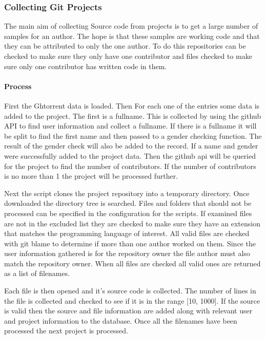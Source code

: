 \documentclass{article}
\begin{document}
\subsubsection{Collecting Git Projects}
The main aim of collecting Source code from projects is to get a large number of samples for an author. The hope is that these samples are working code and that they can be attributed to only the one author. To do this repositories can be checked to make sure they only have one contributor and files checked to make sure only one contributor has written code in them.

\paragraph{Process}
First the Ghtorrent data is loaded. Then For each one of the entries some data is added to the project. The first is a fullname. This is collected by using the github API to find user information and collect a fullname. If there is a fullname it will be split to find the first name and then passed to a gender checking function. The result of the gender check will also be added to the record. If a name and gender were successfully added to the project data. Then the github api will be queried for the project to find the number of contributors. If the number of contributors is no more than 1 the project will be processed further.

Next the script clones the project repository into a temporary directory. Once downloaded the directory tree is searched. Files and folders that should not be processed can be specified in the configuration for the scripts. If examined files are not in the excluded list they are checked to make sure they have an extension that matches the programming language of interest. All valid files are checked with git blame to determine if more than one author worked on them. Since the user information gathered is for the repository owner the file author must also match the repository owner. When all files are checked all valid ones are returned as a list of filenames.

Each file is then opened and it's source code is collected. The number of lines in the file is collected and checked to see if it is in the range [10, 1000]. If the source is valid then the source and file information are added along with relevant user and project information to the database. Once all the filenames have been processed the next project is processed.
\end{document}
